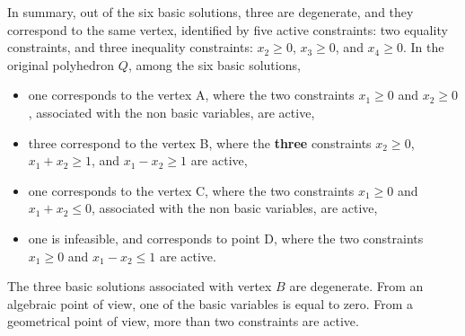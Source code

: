 In summary, out of the six basic solutions, three are degenerate, and
they correspond to the same vertex, identified by five active
constraints: two equality constraints, and three inequality
constraints: $x_2 \geq 0$, $x_3 \geq 0$, and $x_4 \geq 0$.
In the original polyhedron $Q$, among the six basic solutions,
\begin{itemize}
\item one corresponds to the vertex A, where the two
  constraints $x_1 \geq 0$ and $x_2 \geq 0$, associated with the non
  basic variables, are active,
\item three correspond to the vertex B, where the
  \textbf{three} constraints $x_2 \geq 0$, $x_1 + x_2 \geq 1$, and
  $x_1 - x_2 \geq
  1$ are active,
\item one corresponds to the vertex C, where the  two
  constraints $x_1 \geq 0$ and $x_1 + x_2  \leq 0$, associated with the non
  basic variables, are active,
\item one is infeasible, and corresponds to point D, where
  the two constraints $x_1\geq 0$ and $x_1 - x_2\leq 1$ are active.
\end{itemize}
The three basic solutions associated with vertex $B$ are
degenerate. From an algebraic point of view, one of the basic
variables is equal to zero. From a geometrical point of view, more
than two constraints are active. 

